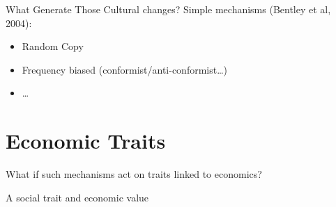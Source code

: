 \documentclass[12pt, notes=show]{beamer}
\begin{document}
\begin{frame}{What Generate Those Cultural changes?}
	Simple mechanisms (Bentley et al, 2004):
	\begin{itemize}
		\item<2->Random Copy 
		\item<3-> Frequency biased (conformist/anti-conformist\dots)
		\item<4->\dots	
	\end{itemize}
\end{frame}

\section{Economic Traits}


\begin{frame}
	\begin{center}
	    What if such mechanisms act on traits linked to economics?
	\end{center}
\end{frame}

\begin{frame}{A social trait and economic value}
	\begin{center}
	\end{center}
\end{frame}
\end{document}
